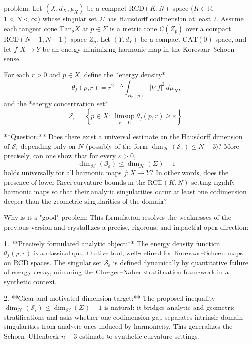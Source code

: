 problem:  
Let \((X,d_X,\mu_X)\) be a compact \(\mathrm{RCD}(K,N)\) space (\(K\in\mathbb{R}\), \(1<N<\infty\)) whose singular set \(\Sigma\) has Hausdorff codimension at least \(2\). Assume each tangent cone \(\mathrm{Tan}_p X\) at \(p\in\Sigma\) is a metric cone \(C(Z_p)\) over a compact \(\mathrm{RCD}(N-1,N-1)\) space \(Z_p\).  
Let \((Y,d_Y)\) be a compact \(\mathrm{CAT}(0)\) space, and let \(f:X\to Y\) be an energy-minimizing harmonic map in the Korevaar–Schoen sense.

For each \(r>0\) and \(p\in X\), define the *energy density*
\[
\theta_f(p,r) = r^{2-N}\int_{B_r(p)}|\nabla f|^2\,d\mu_X,
\]
and the *energy concentration set*  
\[
\mathcal{S}_\varepsilon = \left\{p\in X:\ \limsup_{r\to 0}\theta_f(p,r) \ge \varepsilon\right\}.
\]

**Question:**  
Does there exist a universal estimate on the Hausdorff dimension of \(\mathcal{S}_\varepsilon\) depending only on \(N\) (possibly of the form \(\dim_{\mathcal H}(\mathcal{S}_\varepsilon)\le N-3\))?  
More precisely, can one show that for every \(\varepsilon>0\),
\[
\dim_{\mathcal H}(\mathcal{S}_\varepsilon) \le \dim_{\mathcal H}(\Sigma)-1
\]
holds universally for all harmonic maps \(f:X\to Y\)?  
In other words, does the presence of lower Ricci curvature bounds in the \(\mathrm{RCD}(K,N)\) setting rigidify harmonic maps so that their analytic singularities occur at least one codimension deeper than the geometric singularities of the domain?

Why is it a "good" problem:  
This formulation resolves the weaknesses of the previous version and crystallizes a precise, rigorous, and impactful open direction:

1. **Precisely formulated analytic object:**  
   The energy density function \(\theta_f(p,r)\) is a classical quantitative tool, well-defined for Korevaar–Schoen maps on \(\mathrm{RCD}\) spaces. The singular set \(\mathcal{S}_\varepsilon\) is defined dynamically by quantitative failure of energy decay, mirroring the Cheeger–Naber stratification framework in a synthetic context.

2. **Clear and motivated dimension target:**  
   The proposed inequality \(\dim_{\mathcal H}(\mathcal{S}_\varepsilon)\le \dim_{\mathcal H}(\Sigma)-1\) is natural: it bridges analytic and geometric stratifications and asks whether one codimension gap separates intrinsic domain singularities from analytic ones induced by harmonicity. This generalizes the Schoen–Uhlenbeck \(n-3\)-estimate to synthetic curvature settings.

